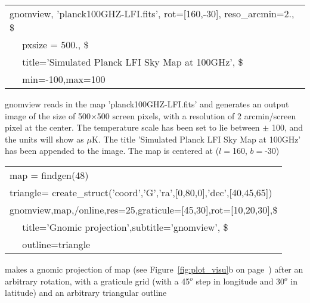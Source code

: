\begin{examples}{1}
{
\begin{tabular}{l} %
gnomview,  'planck100GHZ-LFI.fits', rot=[160,-30], reso\_arcmin=2., \$ \\
$\quad$           pxsize = 500., \$ \\
$\quad$           title='Simulated Planck LFI Sky Map at 100GHz',  \$ \\
$\quad$           min=-100,max=100\\
\end{tabular}
}
{gnomview reads in the map 'planck100GHZ-LFI.fits' and generates
an output image of the size of 500$\times$500 screen pixels, 
with a resolution of 2 arcmin/screen pixel at the center.
The temperature scale has been set to lie between $\pm$ 100, and the units will
show as $\mu$K.
The title 'Simulated Planck
LFI Sky Map at 100GHz' has been appended to the image. 
The map is centered at ($l=$160, $b=$-30) }
\end{examples}

\begin{examples}{2}
{
\begin{tabular}{l} %

map  = findgen(48) \\
triangle= create\_struct('coord','G','ra',[0,80,0],'dec',[40,45,65]) \\
gnomview,map,/online,res=25,graticule=[45,30],rot=[10,20,30],\$ \\
$\quad$	   title='Gnomic projection',subtitle='gnomview', \$ \\
$\quad$           outline=triangle \\
\end{tabular}
}
{makes a gnomic projection of map (see Figure~\ref{fig:plot_visu}b on
page~\pageref{page:plot_visu}) after an arbitrary rotation, with a graticule grid
(with a 45$^o$ step in longitude and 30$^o$ in latitude) and an arbitrary triangular outline}
\end{examples}
